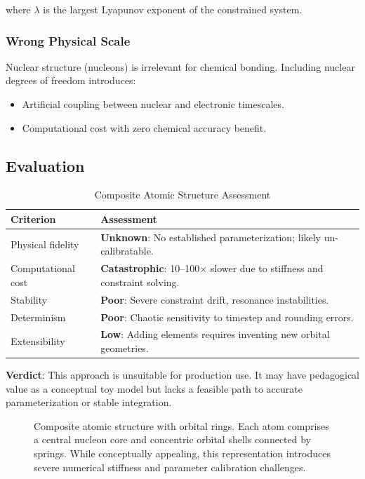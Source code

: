\documentclass[11pt,letterpaper]{article}
\begin{document}
where $\lambda$ is the largest Lyapunov exponent of the constrained system.

\subsubsection{Wrong Physical Scale}

Nuclear structure (nucleons) is irrelevant for chemical bonding. Including nuclear degrees of freedom introduces:
\begin{itemize}
    \item Artificial coupling between nuclear and electronic timescales.
    \item Computational cost with zero chemical accuracy benefit.
\end{itemize}

\subsection{Evaluation}

\begin{table}[h]
\centering
\caption{Composite Atomic Structure Assessment}
\label{tab:composite}
\begin{tabular}{@{}lp{10cm}@{}}
\toprule
\textbf{Criterion} & \textbf{Assessment} \\
\midrule
Physical fidelity & \textbf{Unknown}: No established parameterization; likely un-calibratable. \\
Computational cost & \textbf{Catastrophic}: 10--100$\times$ slower due to stiffness and constraint solving. \\
Stability & \textbf{Poor}: Severe constraint drift, resonance instabilities. \\
Determinism & \textbf{Poor}: Chaotic sensitivity to timestep and rounding errors. \\
Extensibility & \textbf{Low}: Adding elements requires inventing new orbital geometries. \\
\bottomrule
\end{tabular}
\end{table}

\textbf{Verdict}: This approach is unsuitable for production use. It may have pedagogical value as a conceptual toy model but lacks a feasible path to accurate parameterization or stable integration.

\begin{figure}[h]
\centering
{}
\caption{Composite atomic structure with orbital rings. Each atom comprises a central nucleon core and concentric orbital shells connected by springs. While conceptually appealing, this representation introduces severe numerical stiffness and parameter calibration challenges.}
\label{fig:composite}
\end{figure}
\end{document}
